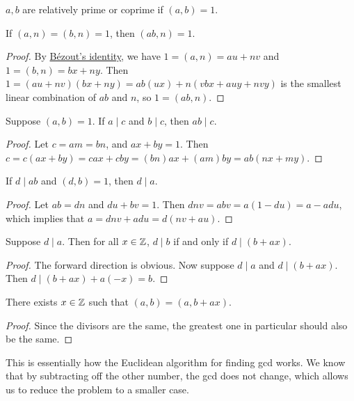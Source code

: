 \begin{definition}
    \(a,b\) are relatively prime or coprime if \((a,b) = 1\).
\end{definition}
\begin{proposition}
    If \((a,n) = (b,n) = 1\), then \((ab,n) = 1\).
\end{proposition}
\begin{proof}
    By \hyperref[thm:bezout]{B\'ezout's identity},
    we have \(1 = (a,n) = au+nv\) and \(1 = (b,n) = bx+ny\).
    Then \(1 = (au+nv)(bx+ny) = ab(ux) + n(vbx+auy+nvy)\)
    is the smallest linear combination of \(ab\) and \(n\),
    so \(1 = (ab,n)\).
\end{proof}
\begin{proposition}
    Suppose \((a,b) = 1\). If \(a \mid c\) and \(b \mid c\), then \(ab \mid c\).
\end{proposition}
\begin{proof}
    Let \(c = am = bn\), and \(ax+by = 1\).
    Then \(c = c(ax+by) = cax + cby = (bn)ax + (am)by = ab(nx+my)\).
\end{proof}
\begin{theorem}\label{thm:coprime-divisors}
    If \(d \mid ab\) and \((d,b) = 1\), then \(d \mid a\).
\end{theorem}
\begin{proof}
    Let \(ab = dn\) and \(du+bv = 1\).
    Then \(dnv = abv = a(1-du) = a - adu\),
    which implies that \(a = dnv + adu = d(nv+au)\).
\end{proof}
\begin{proposition}
    Suppose \(d \mid a\).
    Then for all \(x \in \mathbb{Z}\),
    \(d \mid b\) if and only if \(d \mid (b+ax)\).
\end{proposition}
\begin{proof}
    The forward direction is obvious.
    Now suppose \(d \mid a\) and \(d \mid (b+ax)\).
    Then \(d \mid (b+ax)+a(-x) = b\).
\end{proof}
\begin{corollary}
    There exists \(x \in \mathbb{Z}\) such that \((a,b) = (a,b+ax)\).
\end{corollary}
\begin{proof}
    Since the divisors are the same, the greatest one in particular should also be the same.
\end{proof}
\begin{remark}
    This is essentially how the Euclidean algorithm for finding gcd works.
    We know that by subtracting off the other number,
    the gcd does not change,
    which allows us to reduce the problem to a smaller case.
\end{remark}

